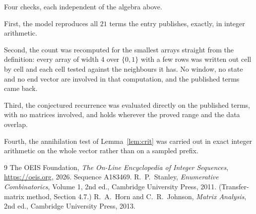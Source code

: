 \documentclass[11pt,a4paper]{article}
\theoremstyle{plain}
\theoremstyle{definition}
\begin{document}
Four checks, each independent of the algebra above.

First, the model reproduces all $21$ terms the entry publishes, exactly, in integer
arithmetic.

Second, the count was recomputed for the smallest arrays straight from the definition: every
array of width $4$ over $\{0,1\}$ with a few rows was written out cell by cell and each cell
tested against the neighbours it has. No window, no state and no end vector are involved in that
computation, and the published terms came back.

Third, the conjectured recurrence was evaluated directly on the published terms, with no
matrices involved, and holds wherever the proved range and the data overlap.

Fourth, the annihilation test of Lemma~\ref{lem:crit} was carried out in exact integer
arithmetic on the whole vector rather than on a sampled prefix.

\begin{thebibliography}{9}
 The OEIS Foundation, \emph{The On-Line Encyclopedia of Integer
Sequences}, \url{https://oeis.org}, 2026. Sequence A183469.
 R.~P.~Stanley, \emph{Enumerative Combinatorics}, Volume 1, 2nd ed.,
Cambridge University Press, 2011. (Transfer-matrix method, Section 4.7.)
 R.~A.~Horn and C.~R.~Johnson, \emph{Matrix Analysis}, 2nd ed., Cambridge
University Press, 2013.
\end{thebibliography}
\end{document}
